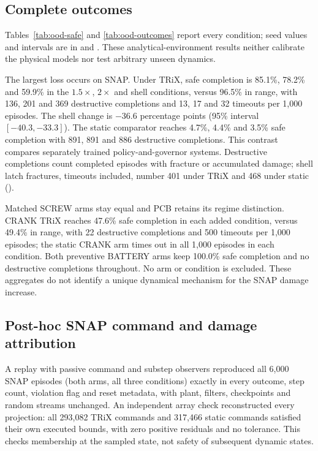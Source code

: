 \documentclass[10pt]{article}
\let\suppsection\suppname
\begin{document}
\subsection{Complete outcomes}

Tables~\ref{tab:ood-safe} and \ref{tab:ood-outcomes} report every condition;
seed values and intervals are in  and
. These analytical-environment
results neither calibrate the physical models nor test arbitrary unseen
dynamics.


The largest loss occurs on SNAP. Under TRiX, safe completion is 85.1\%,
78.2\% and 59.9\% in the $1.5\times$, $2\times$ and shell conditions, versus
96.5\% in range, with 136, 201 and 369 destructive completions and 13, 17 and
32 timeouts per 1,000 episodes. The shell change is $-36.6$ percentage points
(95\% interval $[-40.3,-33.3]$). The static comparator reaches 4.7\%, 4.4\%
and 3.5\% safe completion with 891, 891 and 886 destructive completions. This
contrast compares separately trained policy-and-governor systems. Destructive completions count completed episodes with fracture or
accumulated damage; shell latch fractures, timeouts
included, number 401 under TRiX and 468 under static (\suppsection{S14.4}).

Matched SCREW arms stay equal and PCB retains its regime distinction. CRANK TRiX reaches 47.6\% safe completion in each added
condition, versus 49.4\% in range, with 22 destructive completions and 500
timeouts per 1,000 episodes; the static CRANK arm times out in all 1,000
episodes in each condition. Both preventive BATTERY arms keep 100.0\% safe
completion and no destructive completions throughout. No arm or
condition is excluded. These aggregates do not identify a unique dynamical
mechanism for the SNAP damage increase.



\subsection{Post-hoc SNAP command and damage attribution}
\label{sec:si-snap-attribution}

A replay with passive command and substep observers reproduced all 6,000 SNAP
episodes (both arms, all three conditions) exactly in every outcome, step count, violation
flag and reset metadata, with plant, filters, checkpoints and random streams unchanged.
An independent array check reconstructed every projection: all 293,082 TRiX commands and 317,466
static commands satisfied their own executed bounds, with zero positive
residuals and no tolerance. This checks membership at the sampled state, not
safety of subsequent dynamic states.
\end{document}
